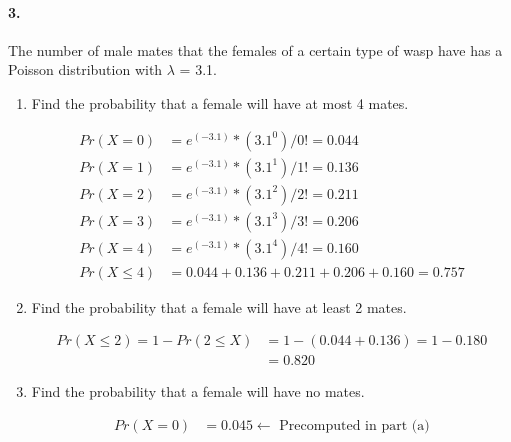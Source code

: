     \paragraph*{3.}
    The number of male mates that the females of a certain type of wasp have has a Poisson distribution with $\lambda$ = 3.1.
    \begin{enumerate}[label=(\alph*)]
        \item Find the probability that a female will have at most 4 mates.
        \\
        \begin{mdframed}
            \begin{align*}
                Pr(X = 0) & = e^{(-3.1)} * (3.1^0) / 0! = 0.044  \\
                Pr(X = 1) & = e^{(-3.1)} * (3.1^1) / 1! = 0.136  \\
                Pr(X = 2) & = e^{(-3.1)} * (3.1^2) / 2! = 0.211  \\
                Pr(X = 3) & = e^{(-3.1)} * (3.1^3) / 3! = 0.206  \\
                Pr(X = 4) & = e^{(-3.1)} * (3.1^4) / 4! = 0.160  \\
                Pr(X \leq 4) & = 0.044 + 0.136 + 0.211 + 0.206 + 0.160 = \boxed{0.757}
            \end{align*}
        \end{mdframed}

        \item Find the probability that a female will have at least 2 mates.
        \\
        \begin{mdframed}
            \begin{align*}
                Pr(X \leq 2) = 1 - Pr(2 \leq X) & = 
                1 - (0.044 + 0.136) = 1 - 0.180 \\
                & = \boxed{0.820}
            \end{align*}
        \end{mdframed}

        \item Find the probability that a female will have no mates.
        \\
        \begin{mdframed}
            \begin{align*}
                Pr(X=0) & = \boxed{0.045} \leftarrow \text{ Precomputed in part (a)}
            \end{align*}
        \end{mdframed}


\end{enumerate}
